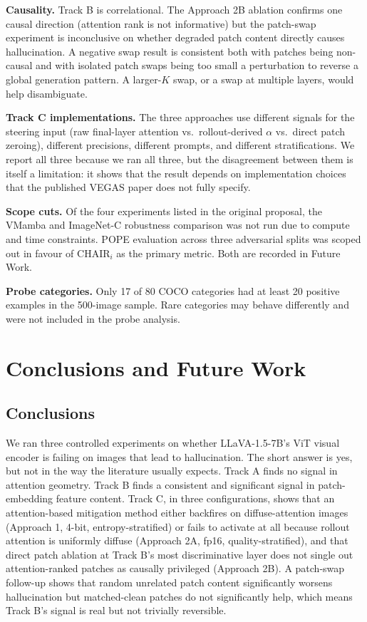 \documentclass[11pt]{article}
\begin{document}
\textbf{Causality.} Track B is correlational. The Approach 2B ablation confirms one
causal direction (attention rank is not informative) but the patch-swap experiment is
inconclusive on whether degraded patch content directly causes hallucination. A negative
swap result is consistent both with patches being non-causal and with isolated patch
swaps being too small a perturbation to reverse a global generation pattern. A larger-$K$
swap, or a swap at multiple layers, would help disambiguate.

\textbf{Track C implementations.} The three approaches use different signals for the
steering input (raw final-layer attention vs.\ rollout-derived $\alpha$ vs.\ direct
patch zeroing), different precisions, different prompts, and different stratifications.
We report all three because we ran all three, but the disagreement between them is
itself a limitation: it shows that the result depends on implementation choices that the
published VEGAS paper does not fully specify.

\textbf{Scope cuts.} Of the four experiments listed in the original proposal, the VMamba
and ImageNet-C robustness comparison was not run due to compute and time constraints.
POPE evaluation across three adversarial splits was scoped out in favour of
$\mathrm{CHAIR}_i$ as the primary metric. Both are recorded in Future Work.

\textbf{Probe categories.} Only 17 of 80 COCO categories had at least 20 positive
examples in the 500-image sample. Rare categories may behave differently and were not
included in the probe analysis.

\section{Conclusions and Future Work}

\subsection{Conclusions}

We ran three controlled experiments on whether LLaVA-1.5-7B's ViT visual encoder is
failing on images that lead to hallucination. The short answer is yes, but not in the
way the literature usually expects. Track A finds no signal in attention geometry.
Track B finds a consistent and significant signal in patch-embedding feature content.
Track C, in three configurations, shows that an attention-based mitigation method either
backfires on diffuse-attention images (Approach 1, 4-bit, entropy-stratified) or fails
to activate at all because rollout attention is uniformly diffuse (Approach 2A, fp16,
quality-stratified), and that direct patch ablation at Track B's most discriminative
layer does not single out attention-ranked patches as causally privileged
(Approach 2B). A patch-swap follow-up shows that random unrelated patch content
significantly worsens hallucination but matched-clean patches do not significantly help,
which means Track B's signal is real but not trivially reversible.
\end{document}
